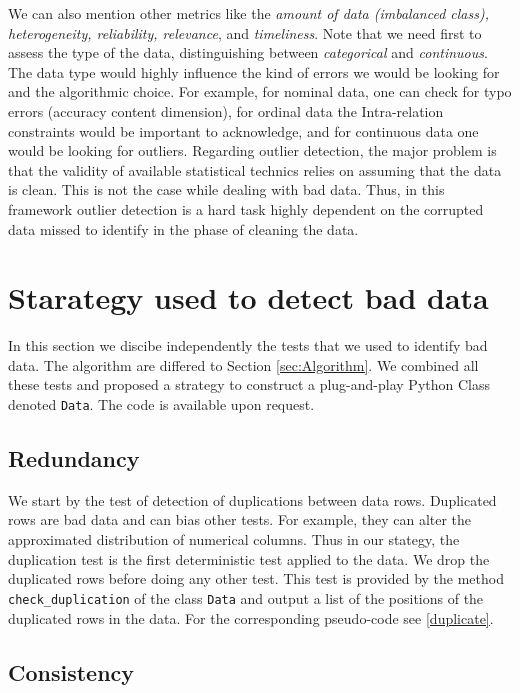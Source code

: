 \documentclass{article}
\begin{document}
We can also mention other metrics like the \textit{amount of data (imbalanced class), heterogeneity, reliability, relevance}, and \textit{timeliness}.
Note that we need first to assess the type of the data, distinguishing between \textit{categorical} and \textit{continuous}.
The data type would highly influence the kind of errors we would be looking for and the algorithmic choice.
For example, for nominal data, one can check for typo errors (accuracy content dimension), for ordinal data the Intra-relation constraints would be important to acknowledge, and for continuous data one would be looking for outliers.
Regarding outlier detection, the major problem is that the validity of available statistical technics relies on assuming that the data is clean.
This is not the case while dealing with bad data.
Thus, in this framework outlier detection is a hard task highly dependent on the corrupted data missed to identify in the phase of cleaning the data.
\section{Starategy used to detect bad data}
\label{sec:Starategy used to detect bad data}
In this section we discibe independently the tests that we used to identify bad data.
The algorithm are differed to Section \ref{sec:Algorithm}.
We combined all these tests and proposed a strategy to construct a plug-and-play Python Class denoted \texttt{Data}.
The code is available upon request.

\subsection{Redundancy} %
\label{sub:Duplication test}
We start by the test of detection of duplications between data rows.
Duplicated rows are bad data and can bias other tests.
For example, they can alter the approximated distribution of numerical columns.
Thus in our stategy, the duplication test is the first deterministic test applied to the data.
We drop the duplicated rows before doing any other test.
This test is provided by the method \texttt{check\_duplication} of the class \texttt{Data} and output a list of the positions of the duplicated rows in the data.
For the corresponding pseudo-code see  \ref{duplicate}.



\subsection{Consistency} %
\end{document}
